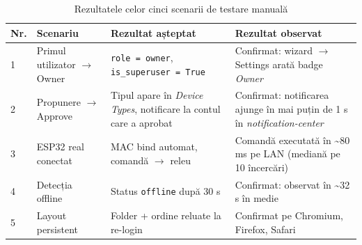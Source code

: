 \begin{table}[htb]
    \centering
        \renewcommand{\arraystretch}{1.3}
    \footnotesize
    \begin{tabular}{|p{1cm}|p{3.5cm}|p{4.2cm}|p{4.5cm}|}
        \hline
        \textbf{Nr.} & \textbf{Scenariu} & \textbf{Rezultat așteptat} & \textbf{Rezultat observat} \\ \hline
        1 & Primul utilizator $\rightarrow$ Owner & \texttt{role = owner}, \texttt{is\_superuser = True} & Confirmat: wizard $\rightarrow$ Settings arată badge \emph{Owner} \\ \hline
        2 & Propunere $\rightarrow$ Approve & Tipul apare în \emph{Device Types}, notificare la contul care a aprobat & Confirmat: notificarea ajunge în mai puțin de 1 s în \emph{notification-center} \\ \hline
        3 & ESP32 real conectat & MAC bind automat, comandă $\rightarrow$ releu & Comandă executată în \textasciitilde 80 ms pe LAN (mediană pe 10 încercări) \\ \hline
        4 & Detecția offline & Status \texttt{offline} după 30 s & Confirmat: observat în \textasciitilde 32 s în medie \\ \hline
        5 & Layout persistent & Folder + ordine reluate la re-login & Confirmat pe Chromium, Firefox, Safari \\ \hline
    \end{tabular}
    \caption{Rezultatele celor cinci scenarii de testare manuală}
    \label{tab:rezultate_teste}
\end{table}

